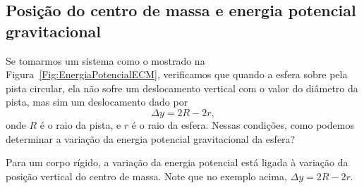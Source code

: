 \subsection{Posição do centro de massa e energia potencial gravitacional}

Se tomarmos um sistema como o mostrado na Figura~\eqref{Fig:EnergiaPotencialECM}, verificamos que quando a esfera sobre pela pista circular, ela não sofre um deslocamento vertical com o valor do diâmetro da pista, mas sim um deslocamento dado por
\begin{equation}
    \Delta y = 2R - 2r,
\end{equation}
%
onde $R$ é o raio da pista, e $r$ é o raio da esfera. Nessas condições, como podemos determinar a variação da energia potencial gravitacional da esfera?

\begin{marginfigure}
\centering
{}
\caption{Para um corpo rígido, a variação da energia potencial está ligada à variação da posição vertical do centro de massa. Note que no exemplo acima, $\Delta y = 2R - 2r$. \label{Fig:EnergiaPotencialECM}}
\end{marginfigure}

